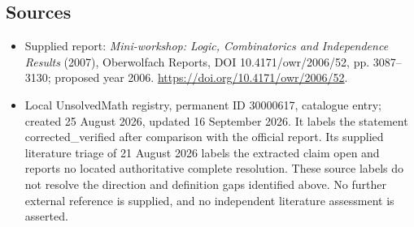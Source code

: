 \documentclass[11pt]{article}
\begin{document}
\subsection{Sources}
\begin{itemize}
\item Supplied report: \emph{Mini-workshop: Logic, Combinatorics and Independence Results} (2007), Oberwolfach Reports, DOI 10.4171/owr/2006/52, pp. 3087--3130; proposed year 2006. \url{https://doi.org/10.4171/owr/2006/52}.
\item Local UnsolvedMath registry, permanent ID 30000617, catalogue entry; created 25 August 2026, updated 16 September 2026. It labels the statement corrected\_verified after comparison with the official report. Its supplied literature triage of 21 August 2026 labels the extracted claim open and reports no located authoritative complete resolution. These source labels do not resolve the direction and definition gaps identified above. No further external reference is supplied, and no independent literature assessment is asserted.
\end{itemize}
\end{document}
